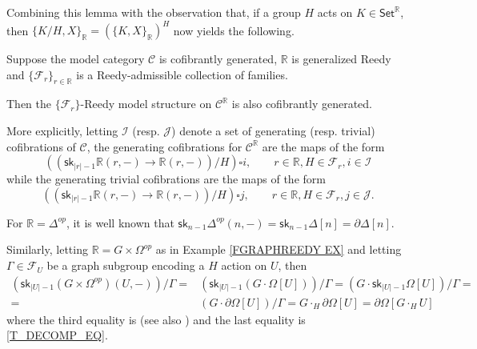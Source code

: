 \documentclass[a4paper,10pt
 ,draft
]{article}%
\begin{document}
Combining this lemma with the observation that, if a group $H$ acts on 
$K \in \mathsf{Set}^{\mathbb{R}}$,
then $\{K/H,X\}_{\mathbb{R}} = \left(\{K,X\}_{\mathbb{R}}\right)^H$ now yields the following.

\begin{proposition}\label{REEDYCOFGEN PROP}
Suppose the model category $\mathcal{C}$ is cofibrantly generated,
$\mathbb{R}$ is generalized Reedy and 
$\{\mathcal{F}_r\}_{r \in \mathbb{R}}$
is a Reedy-admissible collection of families.

Then the $\{\mathcal{F}_r\}$-Reedy model structure on 
$\mathcal{C}^{\mathbb{R}}$ is also cofibrantly generated.

More explicitly, letting 
$\mathcal{I}$ (resp. $\mathcal{J}$)
denote a set of generating (resp. trivial) cofibrations of $\mathcal{C}$,
the generating cofibrations for $\mathcal{C}^{\mathbb{R}}$
are the maps of the form
\[
\left(\left(\mathsf{sk}_{|r|-1} \mathbb{R}(r,-) \to
 \mathbb{R}(r,-)\right)/H \right)
\square
i,
\qquad
r \in \mathbb{R}, H \in \mathcal{F}_r, i \in \mathcal{I}
\]
while the generating trivial cofibrations are the maps of the form
\[
\left(\left(\mathsf{sk}_{|r|-1} \mathbb{R}(r,-) \to
 \mathbb{R}(r,-)\right)/H \right)
\square
j,
\qquad
r \in \mathbb{R}, H \in \mathcal{F}_r, j \in \mathcal{J}.
\]
\end{proposition}


\begin{example}\label{REEDYCOFGEN EX}
For $\mathbb{R} = \Delta^{op}$, it is well known that
$\mathsf{sk}_{n-1} \Delta^{op}(n,-) = \mathsf{sk}_{n-1} \Delta[n] = \partial \Delta[n]$.

Similarly, letting $\mathbb{R} = G \times \Omega^{op}$ as in 
Example \ref{FGRAPHREEDY EX} and letting 
$\Gamma \in \mathcal{F}_U$ be a graph subgroup encoding a $H$ action on $U$, then
\begin{align}
	\left( \mathsf{sk}_{|U|-1} \left( G \times \Omega^{op} \right)(U,-) \right)/\Gamma
= &
	\left( \mathsf{sk}_{|U|-1} \left( G \cdot \Omega[U] \right) \right)/\Gamma
=
	\left( G \cdot \mathsf{sk}_{|U|-1}  \Omega[U] \right)/\Gamma =
\\
= &
	\left( G \cdot \partial \Omega[U] \right)/\Gamma
=
	G \cdot_H \partial \Omega[U] = \partial \Omega[G \cdot_H U]
\end{align}
where the third equality is \cite{BM11} (see also \cite[Cor 5.63]{Per18})
and the last equality is \eqref{T_DECOMP_EQ}.
\end{example}



{}




\end{document}
